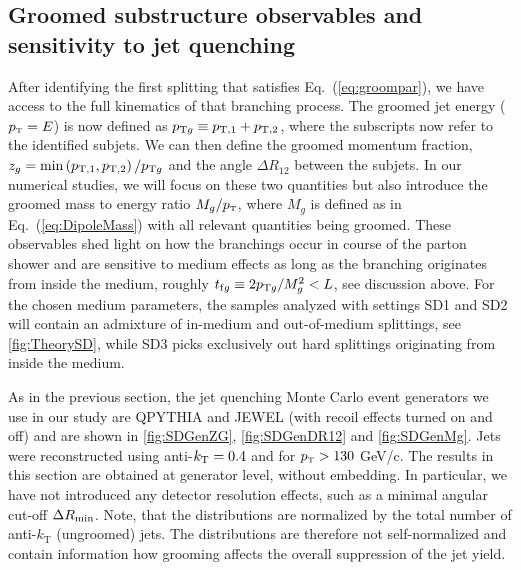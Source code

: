 \subsection{Groomed substructure observables and sensitivity to jet quenching}
\label{sec:groomedobservables}

After identifying the first splitting that satisfies Eq.~(\ref{eq:groompar}), we have access to the full kinematics of that branching process. The groomed jet energy ($p_{\text{\tiny T}} = E$) is now defined as $p_{{\rm \tiny T} g} \equiv p_{\mathrm{T},1}+p_{\mathrm{T},2}$, where the subscripts now refer to the identified subjets. We can then define the groomed momentum fraction, $z_g = \min \left(p_{{\rm \tiny T},1},p_{{\rm \tiny T},2}\right)/p_{{\rm \tiny T}g}$ and the angle $\Delta R_{12}$ between the subjets. In our numerical studies, we will focus on these two quantities but also introduce the groomed mass to energy ratio $M_g/p_{\text{\tiny T}}$, where $M_g$ is defined as in Eq.~(\ref{eq:DipoleMass}) with all relevant quantities being groomed. These observables shed light on how the branchings occur in course of the parton shower and are sensitive to medium effects as long as the branching originates from inside the medium, roughly $ t_{{\rm f}g}\equiv 2 p_{{\rm \tiny T}g}/M_g^2 < L$, see discussion above. For the chosen medium parameters, the samples analyzed with settings SD1 and SD2 will contain an admixture of in-medium and out-of-medium splittings, see \autoref{fig:TheorySD}, while SD3 picks exclusively out hard splittings originating from inside the medium. 

As in the previous section, the jet quenching Monte Carlo event generators we use in our study are QPYTHIA and JEWEL (with recoil effects turned on and off) and are shown in \autoref{fig:SDGenZG}, \ref{fig:SDGenDR12} and \ref{fig:SDGenMg}. Jets were reconstructed using anti-$k_{\rm \tiny T}=0.4$ and for $p_{\text{\tiny T}} > 130$ GeV/c. 
The results in this section are obtained at generator level, without embedding. In particular, we have not introduced any detector resolution effects, such as a minimal angular cut-off $\Delta R_{\rm min}$.
Note, that the distributions are normalized by the total number of anti-$k_{\text{T}}$ (ungroomed) jets. The distributions are therefore not self-normalized and contain information how grooming affects the overall suppression of the jet yield. 

